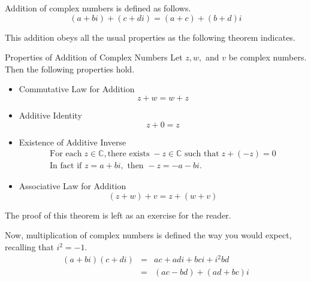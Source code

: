 Addition of complex numbers is defined as follows. 
\begin{equation*}
\left( a+bi\right) +\left( c+di\right) =\left( a+c\right) +\left( b+d\right)i
\end{equation*}

This addition obeys all the usual properties  as the following theorem indicates.

\begin{theorem}{Properties of Addition of Complex Numbers}\label{thm:propertiesofadditioncomplexnumbers}
Let $z,w,$ and $v$ be complex numbers. Then the following properties hold.
\begin{itemize}
\item Commutative Law for Addition
\begin{equation*}
z+w=w+z
\end{equation*}

\item Additive Identity
\begin{equation*}
z+0=z
\end{equation*}

\item Existence of Additive Inverse
\begin{equation*}
\begin{array}{l}
\mbox{For each} \; z\in \mathbb{C}, \mbox{there exists}\; -z\in \mathbb{C} \mbox{ such that}\; 
z+\left( -z\right) =0 \\
\mbox{In fact if } z=a+bi, \mbox{ then } -z=-a-bi.
\end{array}
\end{equation*}

\item Associative Law for Addition
\begin{equation*}
\left( z+w\right) +v= z +\left( w+v\right)
\end{equation*}
\end{itemize}
\end{theorem}

The proof of this theorem is left as an exercise for the reader.

Now, multiplication of complex numbers is defined the way you would expect, recalling that $i^{2} = -1$.
\begin{eqnarray*}
\left( a+bi\right) \left( c+di\right) &=&ac+adi+bci+i^{2}bd \\
&=&\left( ac-bd\right) +\left( ad + bc \right)i 
\end{eqnarray*}

